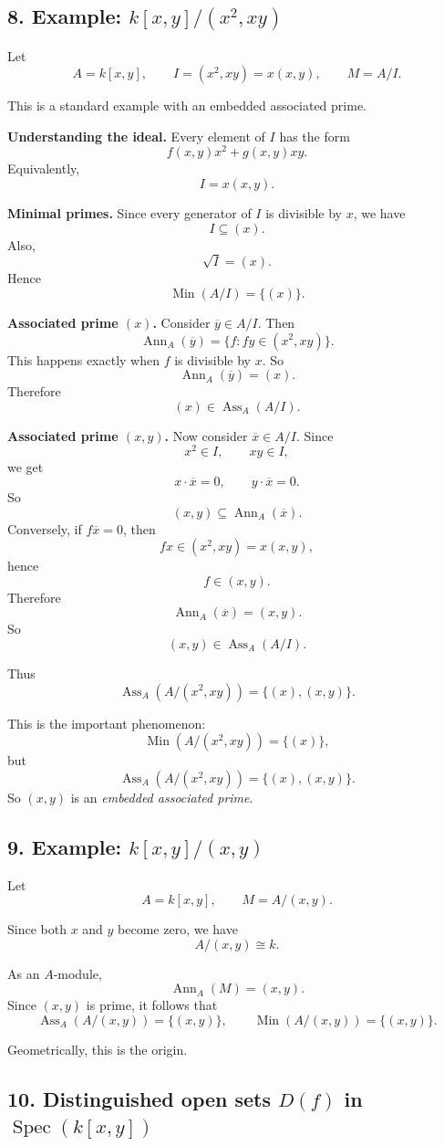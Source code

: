 \documentclass[12pt,a4paper]{article}
\theoremstyle{notespace}
\DeclareMathOperator{\Spec}{Spec}
\DeclareMathOperator{\Ass}{Ass}
\DeclareMathOperator{\Ann}{Ann}
\DeclareMathOperator{\Min}{Min}
\begin{document}
\subsection*{8. Example: \(k[x,y]/(x^2,xy)\)}

Let
\[
A=k[x,y],\qquad I=(x^2,xy)=x(x,y),\qquad M=A/I.
\]

This is a standard example with an embedded associated prime.

\textbf{Understanding the ideal.}
Every element of \(I\) has the form
\[
f(x,y)x^2+g(x,y)xy.
\]
Equivalently,
\[
I=x(x,y).
\]

\textbf{Minimal primes.}
Since every generator of \(I\) is divisible by \(x\), we have
\[
I\subseteq (x).
\]
Also,
\[
\sqrt{I}=(x).
\]
Hence
\[
\Min(A/I)=\{(x)\}.
\]

\textbf{Associated prime \((x)\).}
Consider \(\overline y\in A/I\). Then
\[
\Ann_A(\overline y)=\{f:fy\in (x^2,xy)\}.
\]
This happens exactly when \(f\) is divisible by \(x\). So
\[
\Ann_A(\overline y)=(x).
\]
Therefore
\[
(x)\in \Ass_A(A/I).
\]

\textbf{Associated prime \((x,y)\).}
Now consider \(\overline x\in A/I\). Since
\[
x^2\in I,\qquad xy\in I,
\]
we get
\[
x\cdot \overline x=0,\qquad y\cdot \overline x=0.
\]
So
\[
(x,y)\subseteq \Ann_A(\overline x).
\]
Conversely, if \(f\overline x=0\), then
\[
fx\in (x^2,xy)=x(x,y),
\]
hence
\[
f\in (x,y).
\]
Therefore
\[
\Ann_A(\overline x)=(x,y).
\]
So
\[
(x,y)\in \Ass_A(A/I).
\]

Thus
\[
\Ass_A(A/(x^2,xy))=\{(x),(x,y)\}.
\]

This is the important phenomenon:
\[
\Min(A/(x^2,xy))=\{(x)\},
\]
but
\[
\Ass_A(A/(x^2,xy))=\{(x),(x,y)\}.
\]
So \((x,y)\) is an \emph{embedded associated prime}.

\subsection*{9. Example: \(k[x,y]/(x,y)\)}

Let
\[
A=k[x,y],\qquad M=A/(x,y).
\]

Since both \(x\) and \(y\) become zero, we have
\[
A/(x,y)\cong k.
\]

As an \(A\)-module,
\[
\Ann_A(M)=(x,y).
\]
Since \((x,y)\) is prime, it follows that
\[
\Ass_A(A/(x,y))=\{(x,y)\},
\qquad
\Min(A/(x,y))=\{(x,y)\}.
\]

Geometrically, this is the origin.

\subsection*{10. Distinguished open sets \(D(f)\) in \(\Spec(k[x,y])\)}
\end{document}
